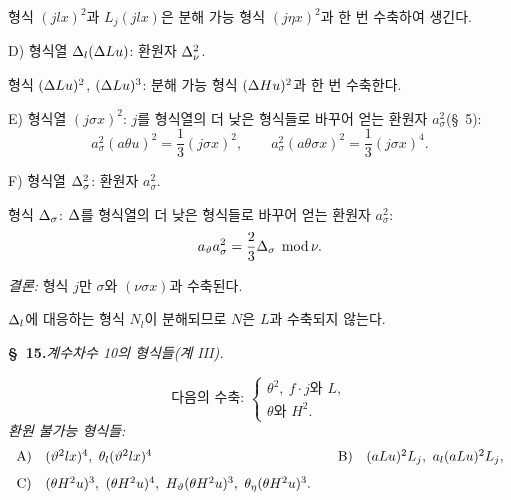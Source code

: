 형식 $(jlx)^2$과 $L_j(jlx)$은 분해 가능 형식 $(j\eta x)^2$과 한 번 수축하여 생긴다.

D) 형식열 $\Delta_l(\Delta Lu)$: 환원자 $\Delta_\nu^2$.

형식 $(\Delta Lu)^2$, $(\Delta Lu)^3$: 분해 가능 형식 $(\Delta Hu)^2$과 한 번 수축한다.

E) 형식열 $(j\sigma x)^2$: $j$를 형식열의 더 낮은 형식들로 바꾸어 얻는 환원자 $a_\sigma^2$(\S\ 5):
\[
a_\sigma^2(a\theta u)^2=\frac13(j\sigma x)^2,
\qquad
 a_\sigma^2(a\theta\sigma x)^2=\frac13(j\sigma x)^4.
\]

F) 형식열 $\Delta_\sigma^2$: 환원자 $a_\sigma^2$.

형식 $\Delta_\sigma$: $\Delta$를 형식열의 더 낮은 형식들로 바꾸어 얻는 환원자 $a_\sigma^2$:
\[
a_\vartheta a_\sigma^2=\frac23\Delta_\sigma\;\operatorname{mod} \nu.
\]

\noindent\emph{결론:} 형식 $j$만 $\sigma$와 $(\nu\sigma x)$과 수축된다.

$\Delta_l$에 대응하는 형식 $N_l$이 분해되므로 $N$은 $L$과 수축되지 않는다.

\begin{center}
\textbf{\S\ 15.}\quad\emph{계수차수 10의 형식들(계 III).}
\end{center}
\[
\text{다음의 수축: }\left\{\begin{array}{l}
\theta^2,
\ f\cdot j\text{와 }L,\\
\theta\text{와 }H^2.
\end{array}\right.
\]
\noindent\emph{환원 불가능 형식들:}
\[
\begin{array}{c@{\quad}l@{\qquad}c@{\quad}l}
\text{A)}&(\vartheta^2lx)^4,
\ \theta_l(\vartheta^2lx)^4&
\text{B)}&(aLu)^2L_j,
\ a_l(aLu)^2L_j,\\[0.8em]
\text{C)}&(\theta H^2u)^3,
\ (\theta H^2u)^4,
\ H_\vartheta(\theta H^2u)^3,
\ \theta_\eta(\theta H^2u)^3.
\end{array}
\]

